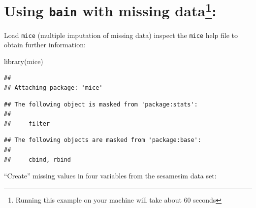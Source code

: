\documentclass[
]{book}
\newenvironment{Shaded}{\begin{snugshade}}{\end{snugshade}}
\newcommand{\FunctionTok}[1]{\textcolor[rgb]{0.00,0.00,0.00}{#1}}
\newcommand{\NormalTok}[1]{#1}
\begin{document}
\hypertarget{using-bain-with-missing-data}{%
\section[Using \texttt{bain} with missing data:]{\texorpdfstring{Using \texttt{bain} with missing data\footnote{Running this example on your machine will take about 60 seconds}:}{Using bain with missing data:}}\label{using-bain-with-missing-data}}

Load \texttt{mice} (multiple imputation of missing data) inspect the \texttt{mice} help file to obtain further information:

\begin{Shaded}
\begin{Highlighting}[]
\FunctionTok{library}\NormalTok{(mice)}
\end{Highlighting}
\end{Shaded}

\begin{verbatim}
## 
## Attaching package: 'mice'
\end{verbatim}

\begin{verbatim}
## The following object is masked from 'package:stats':
## 
##     filter
\end{verbatim}

\begin{verbatim}
## The following objects are masked from 'package:base':
## 
##     cbind, rbind
\end{verbatim}

``Create'' missing values in four variables from the sesamesim data set:
\end{document}
